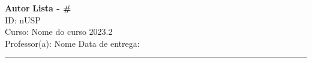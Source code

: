 \documentclass[a4paper, 11pt]{article}
\begin{document}
\newenvironment{solution}
    {\textit{Solution:}}
    {}
\noindent
\large\textbf{Autor} \hfill \textbf{Lista - \#}   \\
ID: nUSP  \\
\normalsize Curso: Nome do curso \hfill 2023.2 \\
Professor(a): Nome \hfill Data de entrega: \\
\noindent\rule{7in}{2.8pt}
\end{document}
